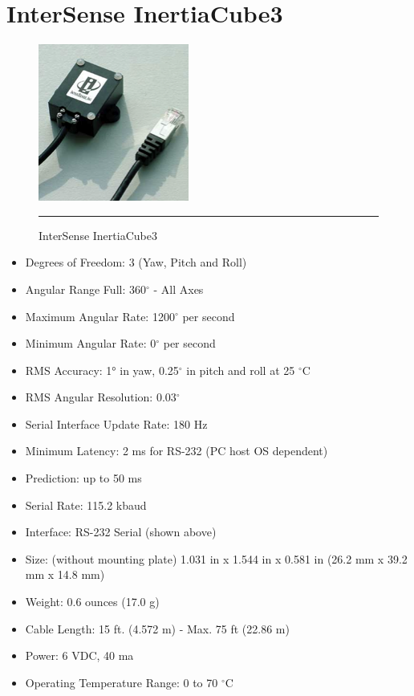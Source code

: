 \chapter{InterSense InertiaCube3}
\label{AppendixGyro}

\begin{figure}[htbp]
  \centering
    \includegraphics{./Primitives/inertiacube3.png}
    \rule{35em}{0.5pt}
  \caption[InterSense InertiaCube3]{InterSense InertiaCube3}
\end{figure}

\begin{itemize}
	\item Degrees of Freedom: 3 (Yaw, Pitch and Roll) 
	\item Angular Range Full: 360$^\circ$ - All Axes 
	\item Maximum Angular Rate: 1200$^\circ$ per second 
	\item Minimum Angular Rate: 0$^\circ$ per second 
	\item RMS Accuracy: 1° in yaw, 0.25$^\circ$ in pitch and roll at 25 $^\circ$C 
	\item RMS Angular Resolution: 0.03$^\circ$
	\item Serial Interface Update Rate: 180 Hz
	\item Minimum Latency: 2 ms for RS-232 (PC host OS dependent) 
	\item Prediction: up to 50 ms 
	\item Serial Rate: 115.2 kbaud 
	\item Interface: RS-232 Serial (shown above) 
	\item Size: (without mounting plate) 1.031 in x 1.544 in x 0.581 in (26.2 mm x 39.2 mm x 14.8 mm) 
	\item Weight: 0.6 ounces (17.0 g) 
	\item Cable Length: 15 ft. (4.572 m) - Max. 75 ft (22.86 m) 
	\item Power: 6 VDC, 40 ma 
	\item Operating Temperature Range: 0 to 70 $^\circ$C 
\end{itemize}
